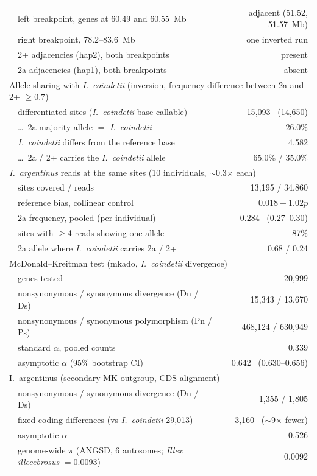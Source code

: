 \documentclass[11pt]{article}
\newcommand{\illex}{\textit{Illex illecebrosus}}
\newcommand{\coin}{\textit{I.\ coindetii}}
\begin{document}
\begin{table}[h]
\begin{tabular}{llr}
    \quad & left breakpoint, genes at 60.49 and 60.55~Mb & adjacent (51.52, 51.57~Mb) \\
    \quad & right breakpoint, 78.2--83.6~Mb & one inverted run \\
    \quad & 2+ adjacencies (hap2), both breakpoints & present \\
    \quad & 2a adjacencies (hap1), both breakpoints & absent \\
    \midrule
    \multicolumn{3}{l}{Allele sharing with \coin{} (inversion, frequency difference between 2a and 2+ $\ge0.7$)} \\
    \quad & differentiated sites (\coin{} base callable) & 15{,}093 \ (14{,}650) \\
    \quad & \dots\ 2a majority allele $=$ \coin{} & 26.0\% \\
    \quad & \coin{} differs from the reference base & 4{,}582 \\
    \quad & \dots\ 2a / 2+ carries the \coin{} allele & 65.0\% / 35.0\% \\
    \midrule
    \multicolumn{3}{l}{\textit{I.\ argentinus} reads at the same sites (10 individuals, $\sim$0.3$\times$ each)} \\
    \quad & sites covered / reads & 13{,}195 / 34{,}860 \\
    \quad & reference bias, collinear control & $0.018+1.02p$ \\
    \quad & 2a frequency, pooled (per individual) & 0.284 \ (0.27--0.30) \\
    \quad & sites with $\ge$4 reads showing one allele & 87\% \\
    \quad & 2a allele where \coin{} carries 2a / 2+ & 0.68 / 0.24 \\
    \midrule
    \multicolumn{3}{l}{McDonald--Kreitman test (mkado, \coin{} divergence)} \\
    \quad & genes tested & 20{,}999 \\
    \quad & nonsynonymous / synonymous divergence (Dn / Ds) & 15{,}343 / 13{,}670 \\
    \quad & nonsynonymous / synonymous polymorphism (Pn / Ps) & 468{,}124 / 630{,}949 \\
    \quad & standard $\alpha$, pooled counts & 0.339 \\
    \quad & asymptotic $\alpha$ (95\% bootstrap CI) & 0.642 \ (0.630--0.656) \\
    \midrule
    \multicolumn{3}{l}{I.\ argentinus (secondary MK outgroup, CDS alignment)} \\
    \quad & nonsynonymous / synonymous divergence (Dn / Ds) & 1{,}355 / 1{,}805 \\
    \quad & fixed coding differences (vs \coin{} 29{,}013) & 3{,}160 \ ($\sim$9$\times$ fewer) \\
    \quad & asymptotic $\alpha$ & 0.526 \\
    \quad & genome-wide $\pi$ (ANGSD, 6 autosomes; \illex{} $=0.0093$) & 0.0092 \\
    \bottomrule
  \end{tabular}
\end{table}
\end{document}
